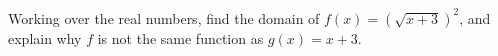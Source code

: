 Working over the real numbers, find the domain of $f(x)=\left(\sqrt{x+3}\right)^2$, and explain why $f$ is not the same function as $g(x)=x+3$.
